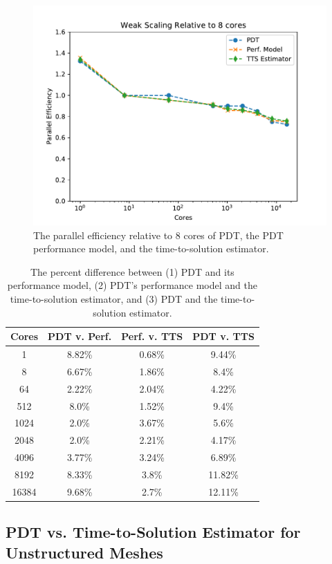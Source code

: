 \documentclass[times,final]{elsarticle}
\begin{document}
\begin{figure}[ht]
\centering
\includegraphics[scale=0.8]{../figures/scaling_tts.pdf}
\caption{The parallel efficiency relative to 8 cores of PDT, the PDT performance model, and the time-to-solution estimator.}
\label{weak_scaling_tts}
\end{figure}
\begin{table}[ht]
\centering
\caption{The percent difference between (1) PDT and its performance model, (2) PDT's performance model and the time-to-solution estimator, and (3) PDT and the time-to-solution estimator.}
\label{scaling_percent_diff}
\begin{tabular}{c|c|c|c}
\textbf{Cores} & \textbf{PDT v. Perf.} & \textbf{Perf. v. TTS} & \textbf{PDT v. TTS} \\ \hline
1&8.82\%&0.68\%&9.44\% \\ \hline
8&6.67\%&1.86\%&8.4\% \\ \hline
64&2.22\%&2.04\%&4.22\% \\ \hline
512&8.0\%&1.52\%&9.4\% \\ \hline
1024&2.0\%&3.67\%&5.6\% \\ \hline
2048&2.0\%&2.21\%&4.17\% \\ \hline
4096&3.77\%&3.24\%&6.89\% \\ \hline
8192&8.33\%&3.8\%&11.82\% \\ \hline
16384&9.68\%&2.7\%&12.11\%
\end{tabular}
\end{table}

\subsection{PDT vs. Time-to-Solution Estimator for Unstructured Meshes}
\end{document}

